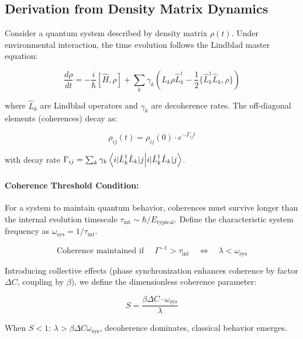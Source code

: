 \documentclass[12pt,a4paper]{article}
\begin{document}
\subsection{Derivation from Density Matrix Dynamics}

Consider a quantum system described by density matrix $\rho(t)$. Under environmental interaction, the time evolution follows the Lindblad master equation:

\begin{equation}
\frac{d\rho}{dt} = -\frac{i}{\hbar}[\hat{H}, \rho] + \sum_k \gamma_k \left( \hat{L}_k \rho \hat{L}_k^\dagger - \frac{1}{2}\{\hat{L}_k^\dagger \hat{L}_k, \rho\} \right)
\label{eq:lindblad}
\end{equation}

where $\hat{L}_k$ are Lindblad operators and $\gamma_k$ are decoherence rates. The off-diagonal elements (coherences) decay as:

\begin{equation}
\rho_{ij}(t) = \rho_{ij}(0) \cdot e^{-\Gamma_{ij} t}
\label{eq:coherence_decay}
\end{equation}

with decay rate $\Gamma_{ij} = \sum_k \gamma_k \braket{i|\hat{L}_k^\dagger \hat{L}_k|j}$.

\paragraph{Coherence Threshold Condition:}
For a system to maintain quantum behavior, coherences must survive longer than the internal evolution timescale $\tau_{\text{int}} \sim \hbar / E_{\text{typical}}$. Define the characteristic system frequency as $\omega_{\text{sys}} = 1/\tau_{\text{int}}$.

\begin{equation}
\text{Coherence maintained if } \quad \Gamma^{-1} > \tau_{\text{int}} \quad \Leftrightarrow \quad \lambda < \omega_{\text{sys}}
\label{eq:coherence_condition}
\end{equation}

Introducing collective effects (phase synchronization enhances coherence by factor $\Delta C$, coupling by $\beta$), we define the dimensionless coherence parameter:

\begin{equation}
S = \frac{\beta \Delta C \cdot \omega_{\text{sys}}}{\lambda}
\label{eq:s_definition}
\end{equation}

When $S < 1$: $\lambda > \beta \Delta C \omega_{\text{sys}}$, decoherence dominates, classical behavior emerges.
\end{document}
